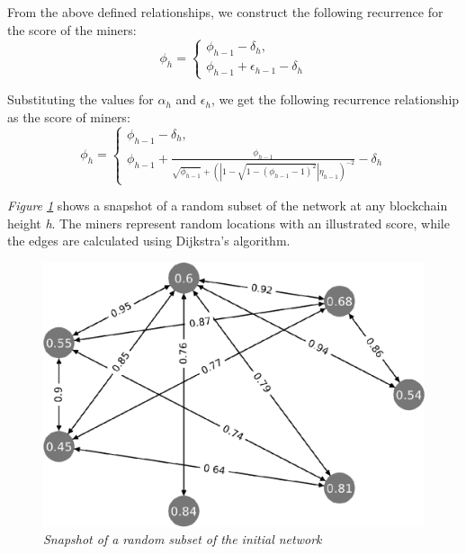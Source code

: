 \documentclass[10pt, nonatbib, nocopyrightspace, reprint]{sigplanconf}
\begin{document}
From the above defined relationships, we construct the following recurrence for the score of the miners:
\begin{equation*} \label{score}
        \phi_h = \begin{cases}
                \phi_{h-1} - \delta_h, \\
                \phi_{h-1} + \epsilon_{h-1} - \delta_h
        \end{cases}
\end{equation*}

Substituting the values for $\alpha_h$ and $\epsilon_h$, we get the following recurrence relationship as the score of miners:
\begin{equation*} \label{recurrence}
        \phi_h = \begin{cases}
                \phi_{h-1} - \delta_h,\\
                \phi_{h-1} + \frac{\phi_{h-1}}{\sqrt{\phi_{h-1}} + \left(\left\lvert1 - \sqrt{1 - (\phi_{h-1} - 1)^2}\right\rvert \eta_{h-1}\right)^{-2}} -\delta_h
        \end{cases}
\end{equation*}

\emph{Figure \ref{fig:score-graph}} shows a snapshot of a random subset of the network at any blockchain height \textit{h}. The miners represent random locations with an illustrated score, while the edges are calculated using Dijkstra's algorithm\cite{dijkstra}.

\begin{figure}[H]
    \begin{center}
          \includegraphics[width=0.8\columnwidth]{chart.eps}
          \caption{\emph{Snapshot of a random subset of the initial network}}
          \label{fig:score-graph}
     \end{center}
\end{figure}
\end{document}
